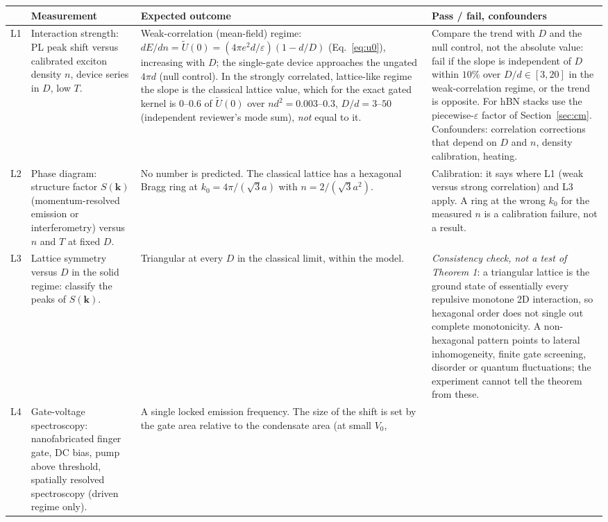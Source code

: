 \documentclass[11pt,a4paper]{article}
\begin{document}
\begin{longtable}{@{}p{}p{}p{}p{}@{}}
\toprule
 & \textbf{Measurement} & \textbf{Expected outcome} & \textbf{Pass / fail, confounders} \\ \midrule
\endhead
L1 & Interaction strength: PL peak shift versus calibrated exciton density $n$, device series in $D$, low $T$.
 & Weak-correlation (mean-field) regime: $dE/dn=\tilde U(0)=(4\pi e^2d/\varepsilon)(1-d/D)$ (Eq.~\ref{eq:u0}), increasing with
 $D$; the single-gate device approaches the ungated $4\pi d$ (null control). In the strongly correlated, lattice-like regime the slope is
 the classical lattice value, which for the exact gated kernel is $0$--$0.6$ of $\tilde U(0)$ over $nd^2=0.003$--$0.3$,
 $D/d=3$--$50$ (independent reviewer's mode sum), \emph{not} equal to it.
 & Compare the trend with $D$ and the null control, not the absolute value: fail if the slope is independent of $D$ within $10\%$ over
 $D/d\in[3,20]$ in the weak-correlation regime, or the trend is opposite. For hBN stacks use the piecewise-$\varepsilon$ factor of Section~\ref{sec:cm}.
 Confounders: correlation corrections that depend on $D$ and $n$, density calibration, heating. \\
L2 & Phase diagram: structure factor $S(\mathbf k)$ (momentum-resolved emission or interferometry) versus $n$ and $T$ at fixed $D$.
 & No number is predicted. The classical lattice has a hexagonal Bragg ring at $k_0=4\pi/(\sqrt3a)$ with $n=2/(\sqrt3a^2)$.
 & Calibration: it says where L1 (weak versus strong correlation) and L3 apply. A ring at the wrong $k_0$ for the measured $n$ is a
 calibration failure, not a result. \\
L3 & Lattice symmetry versus $D$ in the solid regime: classify the peaks of $S(\mathbf k)$.
 & Triangular at every $D$ in the classical limit, within the model.
 & \emph{Consistency check, not a test of Theorem 1}: a triangular lattice is the ground state of essentially every repulsive monotone
 2D interaction, so hexagonal order does not single out complete monotonicity. A non-hexagonal pattern points to lateral inhomogeneity,
 finite gate screening, disorder or quantum fluctuations; the experiment cannot tell the theorem from these. \\
L4 & Gate-voltage spectroscopy: nanofabricated finger gate, DC bias, pump above threshold, spatially resolved spectroscopy
 (driven regime only).
 & A single locked emission frequency. The size of the shift is set by the gate area relative to the condensate area (at small $V_0$,

\end{longtable}
\end{document}
